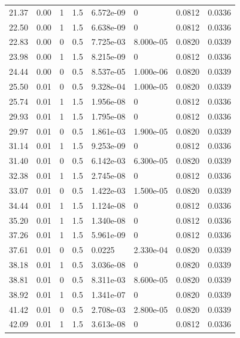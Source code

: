 \documentclass[preview]{standalone}
\begin{document}
{{\begin{tabular}{L{1.2cm}C{1.2cm} C{0.3cm}C{0.5cm} C{1.4cm}C{1.4cm} C{1.4cm}C{1.4cm}}
  21.37  &  0.00  & 1     & 1.5 &  6.572e-09  & 0  & 0.0812 &  0.0336   \\ 
  22.50  &  0.00  & 1     & 1.5 &  6.638e-09  & 0  & 0.0812 &  0.0336   \\ 
  22.83  &  0.00  & 0     & 0.5 &  7.725e-03  & 8.000e-05  & 0.0820 &  0.0339   \\ 
  23.98  &  0.00  & 1     & 1.5 &  8.215e-09  & 0  & 0.0812 &  0.0336   \\ 
  24.44  &  0.00  & 0     & 0.5 &  8.537e-05  & 1.000e-06  & 0.0820 &  0.0339   \\ 
  25.50  &  0.01  & 0     & 0.5 &  9.328e-04  & 1.000e-05  & 0.0820 &  0.0339   \\ 
  25.74  &  0.01  & 1     & 1.5 &  1.956e-08  & 0  & 0.0812 &  0.0336   \\ 
  29.93  &  0.01  & 1     & 1.5 &  1.795e-08  & 0  & 0.0812 &  0.0336   \\ 
  29.97  &  0.01  & 0     & 0.5 &  1.861e-03  & 1.900e-05  & 0.0820 &  0.0339   \\ 
  31.14  &  0.01  & 1     & 1.5 &  9.253e-09  & 0  & 0.0812 &  0.0336   \\ 
  31.40  &  0.01  & 0     & 0.5 &  6.142e-03  & 6.300e-05  & 0.0820 &  0.0339   \\ 
  32.38  &  0.01  & 1     & 1.5 &  2.745e-08  & 0  & 0.0812 &  0.0336   \\ 
  33.07  &  0.01  & 0     & 0.5 &  1.422e-03  & 1.500e-05  & 0.0820 &  0.0339   \\ 
  34.44  &  0.01  & 1     & 1.5 &  1.124e-08  & 0  & 0.0812 &  0.0336   \\ 
  35.20  &  0.01  & 1     & 1.5 &  1.340e-08  & 0  & 0.0812 &  0.0336   \\ 
  37.26  &  0.01  & 1     & 1.5 &  5.961e-09  & 0  & 0.0812 &  0.0336   \\ 
  37.61  &  0.01  & 0     & 0.5 &  0.0225  & 2.330e-04  & 0.0820 &  0.0339   \\ 
  38.18  &  0.01  & 1     & 0.5 &  3.036e-08  & 0  & 0.0820 &  0.0339   \\ 
  38.81  &  0.01  & 0     & 0.5 &  8.311e-03  & 8.600e-05  & 0.0820 &  0.0339   \\ 
  38.92  &  0.01  & 1     & 0.5 &  1.341e-07  & 0  & 0.0820 &  0.0339   \\ 
  41.42  &  0.01  & 0     & 0.5 &  2.708e-03  & 2.800e-05  & 0.0820 &  0.0339   \\ 
  42.09  &  0.01  & 1     & 1.5 &  3.613e-08  & 0  & 0.0812 &  0.0336   \\ 

\end{tabular}}}
\end{document}
